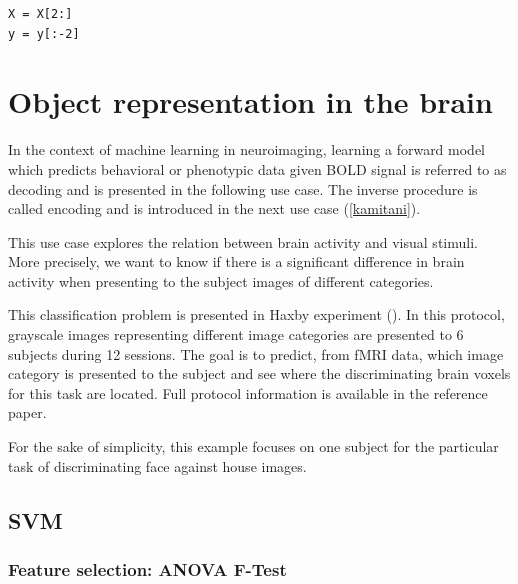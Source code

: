 \documentclass{frontiersSCNS} %
\begin{document}

\begin{lstlisting}
X = X[2:]
y = y[:-2]
\end{lstlisting}

\section{Object representation in the brain}

In the context of machine learning in neuroimaging, learning a forward model
which predicts behavioral or phenotypic data given BOLD signal is referred to as
decoding and is presented in the following use case. The inverse procedure is
called encoding \cite{Naselaris2011} and is introduced in the next use case
(\ref{kamitani}).

This use case explores the relation between brain activity and visual
stimuli. More precisely, we want to know if there is a significant difference
in brain activity when presenting to the subject images of different categories.

This classification problem is presented in Haxby experiment (\cite{haxby2001}).
In this protocol, grayscale images representing different image categories
are presented to 6 subjects during 12 sessions. The goal is to predict,
from fMRI data, which image category is presented
to the subject and see where the discriminating brain voxels for this task are
located. Full protocol information is available in the reference paper.

For the sake of simplicity, this example focuses on one subject for the
particular task of discriminating face against house images.

\subsection{SVM}

\subsubsection{Feature selection: ANOVA F-Test}
\end{document}
